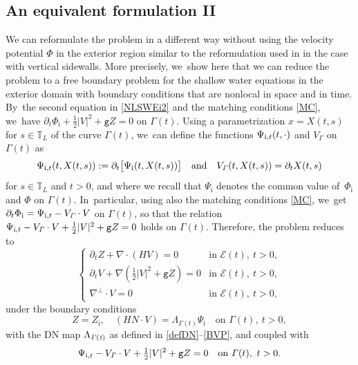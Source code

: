 \documentclass[10pt]{amsart}
\newcommand{\gr}{{\mathtt g}}
\newcommand{\dt}{\partial_t}
\newcommand{\cE}{{\mathcal E}}
\newcommand{\itGamma}{\mathit{\Gamma}}
\theoremstyle{definition}
\begin{document}
\subsection{An equivalent formulation II}\label{subsect:EF2}
We can reformulate the problem in a different way without using the velocity potential $\Phi$ in the exterior region similar to the reformulation used in
\cite[Section 5.1]{IguchiLannes2023} in the case with vertical sidewalls.
More precisely, we~show here that we can reduce the problem to a free boundary problem for the shallow water equations in the exterior domain
with boundary conditions that are nonlocal in space and in time. By~the second equation in \eqref{NLSWEi2} and the matching conditions \eqref{MC}, we~have $\dt\Phi_\mathrm{i}+\frac12|V|^2+\gr Z=0$ on $\itGamma(t)$.
Using a parametrization $x=X(t,s)$ for $s\in {\mathbb T}_L$ of the curve $\itGamma(t)$, we~can define the functions $\Psi_{{\rm i},t}(t,\cdot)$ and $V_{\itGamma}$ on $\itGamma(t)$ as
\[
\Psi_{{\rm i},t}(t,X(t,s)):=\partial_t \bigl[ \Psi_\mathrm{i}(t,X(t,s))\bigr] \quad\mbox{and}\quad V_\itGamma(t,X(t,s))=\dt X(t,s)
\]
for $s\in {\mathbb T}_L$ and $t>0$, and where we recall that $\Psi_\mathrm{i}$ denotes the common value of~$\Phi_\mathrm{i}$ and $\Phi$ on $\itGamma(t)$. In~particular, using also the matching conditions \eqref{MC}, we~get $\dt \Phi_\mathrm{i}=\Psi_{{\rm i},t} - V_\itGamma\cdot V$ on $\itGamma(t)$,
so that the relation $\Psi_{{\rm i},t} - V_\itGamma\cdot V+\tfrac12|V|^2+\gr Z=0$ holds on $\itGamma(t)$.
Therefore, the problem reduces to
\begin{equation}\label{NLSWEe4}
\begin{cases}
\dt Z+\nabla\cdot(HV) = 0 &\text{in } \cE(t), \ t>0, \\
\dt V+\nabla(\frac12|V|^2+\gr Z) = 0 &\text{in } \cE(t), \ t>0, \\
\nabla^\perp\cdot V = 0 &\text{in } \cE(t), \ t>0,
\end{cases}
\end{equation}
under the boundary conditions
\begin{equation}\label{BC4}
Z=Z_\mathrm{i}, \quad (HN\cdot V) = \Lambda_{\itGamma(t)}\Psi_\mathrm{i} \quad\text{on } \itGamma(t), \ t>0,
\end{equation}
with the DN map $\Lambda_{\it\Gamma(t)}$ as defined in \eqref{defDN}--\eqref{BVP}, and coupled with
\begin{equation}\label{ODE}
\Psi_{{\rm i},t} - V_\itGamma\cdot V+\tfrac12 |V|^2+\gr Z=0 \quad\text{on } \itGamma(t), \ t>0.
\end{equation}
\end{document}
